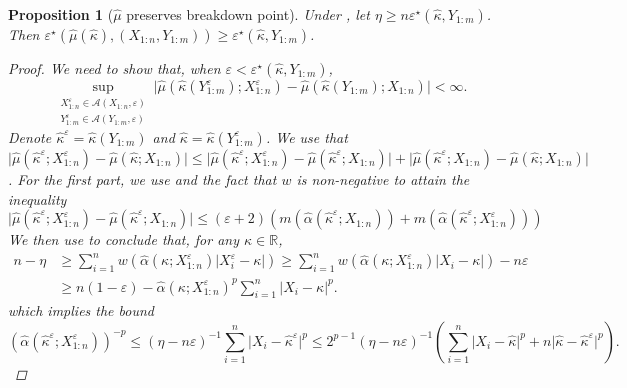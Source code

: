 \documentclass{article}
\theoremstyle{plain}
\newtheorem{proposition}[theorem]{Proposition}
\theoremstyle{definition}
\def\R{\mathbb{R}} %
\def\eps{\varepsilon}
\def\sA{\mathcal{A}}
\begin{document}
  \begin{proposition}[\( \widehat{\mu }  \) preserves breakdown point]
    Under , let \(  \eta \ge  n\varepsilon^\star (\widehat{\kappa }, Y_{1:m} )  \). Then \(  \varepsilon^\star(\widehat{\mu }(\widehat{\kappa } ),(X_{1:n},Y_{1:m}) ) \ge \varepsilon^\star(\widehat{\kappa},Y_{1:m} ) \). 
    \begin{proof}
    We need to show that, when \( \varepsilon < \varepsilon^\star(\widehat{\kappa }, Y_{1:m} )  \),  \[
      \sup_{\substack{X_{1:n}^\varepsilon \in \sA(X_{1:n}, \varepsilon )\\Y_{1:m}^\varepsilon \in \sA(Y_{1:m}, \varepsilon )}} \lvert \widehat{\mu}(\widehat{\kappa }(Y_{1:m}^\varepsilon); X_{1:n}^\varepsilon  ) - \widehat{\mu }(\widehat{\kappa}(Y_{1:m});X_{1:n})   \rvert < \infty.
    \] 
    Denote \( \widehat{\kappa }^\varepsilon = \widehat{\kappa }(Y_{1:m})   \) and \( \widehat{\kappa }=\widehat{\kappa }(Y^\varepsilon _{1:m})   \). We use that \( \lvert \widehat{\mu }(\widehat{\kappa }^\varepsilon ;X_{1:n}^\varepsilon  ) - \widehat{\mu }(\widehat{\kappa };X_{1:n} )   \rvert \le \lvert \widehat{\mu }(\widehat{\kappa }^\varepsilon; X_{1:n}^\varepsilon  ) - \widehat{\mu }(\widehat{\kappa }^\varepsilon ; X_{1:n} )   \rvert +  \lvert \widehat{\mu }(\widehat{\kappa }^\varepsilon; X_{1:n}  ) - \widehat{\mu }(\widehat{\kappa } ; X_{1:n} )   \rvert  \). For the first part, we use  and the fact that \( w \) is non-negative to attain the inequality \[
      \lvert \widehat{\mu }(\widehat{\kappa }^\varepsilon ;X_{1:n}^\varepsilon  ) -\widehat{\mu }(\widehat{\kappa }^\varepsilon ; X_{1:n} )  \rvert  \le \left(\eps+2\right) \left(m(\widehat{\alpha}(\widehat{\kappa } ^\varepsilon; X_{1:n}   ) )+m(\widehat{\alpha }(\widehat{\kappa }^\varepsilon ; X_{1:n}^\varepsilon    )  )\right)
    \] 
    We then use  to conclude that, for any \( \kappa \in \R \),  
    \begin{align*}
      n-\eta &\ge  \sum_{i=1}^nw(\widehat{\alpha }(\kappa; X^\varepsilon _{1:n})\lvert X_i^\varepsilon  - \kappa   \rvert ) \ge  \sum_{i=1}^nw(\widehat{\alpha }(\kappa; X_{1:n}^\varepsilon )\lvert X_i - \kappa   \rvert ) - n\varepsilon \\&\ge  n(1-\varepsilon )- \widehat{\alpha }(\kappa ; X^\varepsilon _{1:n} )^p\sum_{i=1}^n \lvert X_i - \kappa   \rvert^p.
    \end{align*}
    which implies the bound
    \[
      (\widehat{\alpha } (\widehat{\kappa } ^\varepsilon ; X^\varepsilon _{1:n}) )^{-p} \le (\eta-n\varepsilon)^{-1}\sum_{i=1}^n \lvert X_i- \widehat{\kappa }^\varepsilon    \rvert^p \le 2^{p-1}(\eta -n \varepsilon )^{-1}\left(\sum_{i=1}^n \lvert X_i - \widehat{\kappa }  \rvert^p + n\lvert \widehat{\kappa } -\widehat{\kappa }^\varepsilon    \rvert^p  \right).
\]
\end{proof}
\end{proposition}
\end{document}
